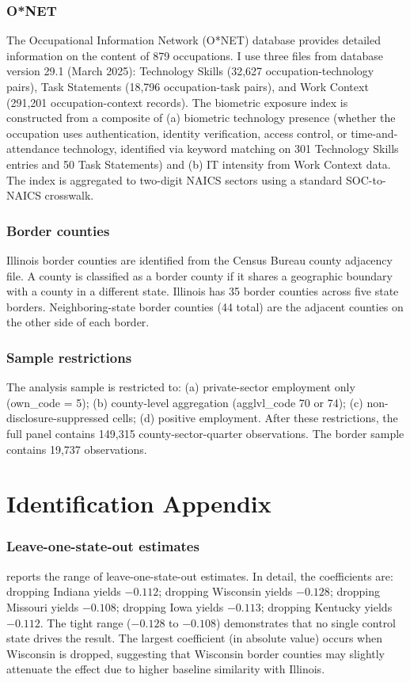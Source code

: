 \documentclass[12pt]{article}
\begin{document}
\subsubsection*{O*NET} The Occupational Information Network (O*NET) database provides detailed information on the content of 879 occupations. I use three files from database version 29.1 (March 2025): Technology Skills (32,627 occupation-technology pairs), Task Statements (18,796 occupation-task pairs), and Work Context (291,201 occupation-context records). The biometric exposure index is constructed from a composite of (a) biometric technology presence (whether the occupation uses authentication, identity verification, access control, or time-and-attendance technology, identified via keyword matching on 301 Technology Skills entries and 50 Task Statements) and (b) IT intensity from Work Context data. The index is aggregated to two-digit NAICS sectors using a standard SOC-to-NAICS crosswalk.

\subsubsection*{Border counties} Illinois border counties are identified from the Census Bureau county adjacency file. A county is classified as a border county if it shares a geographic boundary with a county in a different state. Illinois has 35 border counties across five state borders. Neighboring-state border counties (44 total) are the adjacent counties on the other side of each border.

\subsubsection*{Sample restrictions} The analysis sample is restricted to: (a) private-sector employment only (own\_code = 5); (b) county-level aggregation (agglvl\_code 70 or 74); (c) non-disclosure-suppressed cells; (d) positive employment. After these restrictions, the full panel contains 149,315 county-sector-quarter observations. The border sample contains 19,737 observations.

\section{Identification Appendix}
\label{sec:id_appendix}

\subsubsection*{Leave-one-state-out estimates}  reports the range of leave-one-state-out estimates. In detail, the coefficients are: dropping Indiana yields $-0.112$; dropping Wisconsin yields $-0.128$; dropping Missouri yields $-0.108$; dropping Iowa yields $-0.113$; dropping Kentucky yields $-0.112$. The tight range ($-0.128$ to $-0.108$) demonstrates that no single control state drives the result. The largest coefficient (in absolute value) occurs when Wisconsin is dropped, suggesting that Wisconsin border counties may slightly attenuate the effect due to higher baseline similarity with Illinois.
\end{document}
